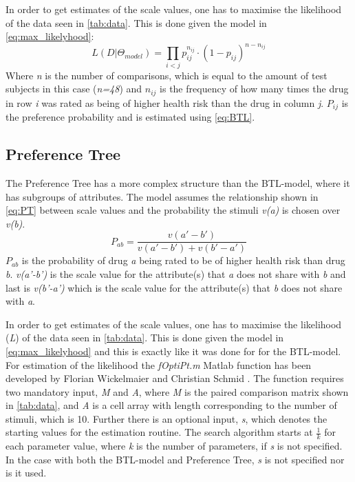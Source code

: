 In order to get estimates of the scale values, one has to maximise the likelihood of the data seen in \autoref{tab:data}. This is done given the model in \autoref{eq:max_likelyhood}: 
%
\begin{equation}
L(D|\Theta_{model}) = \prod_{i<j} p_{ij} ^{n_{ij}}\cdot(1- p_{ij})^{n-n_{ij}}
\label{eq:max_likelyhood}
\end{equation}
\noindent 
%
Where \textit{n} is the number of comparisons, which is equal to the amount of test subjects in this case (\textit{n=48}) and $n_{ij}$ is the frequency of how many times the drug in row \textit{i} was rated as being of higher health risk than the drug in column \textit{j}. $P_{ij}$ is the preference probability and is estimated using \autoref{eq:BTL}. 

\subsection*{Preference Tree}
%
The Preference Tree has a more complex structure than the BTL-model, where it has subgroups of attributes. The model assumes the relationship shown in \autoref{eq:PT} between scale values and the probability the stimuli \textit{v(a)} is chosen over \textit{v(b)}.
%
\begin{equation}
P_{ab} =\frac{v(a'-b')}{v(a'-b')+v(b'-a')} 
\label{eq:PT}
\end{equation}
\noindent
%
$P_{ab}$ is the probability of drug \textit{a} being rated to be of higher health risk than drug \textit{b}. \textit{v(a'-b')} is the scale value for the attribute(s) that \textit{a} does not share with \textit{b} and last is \textit{v(b'-a')} which is the scale value for the attribute(s) that \textit{b} does not share with \textit{a}.

In order to get estimates of the scale values, one has to maximise the likelihood (\textit{L}) of the data seen in \autoref{tab:data}. This is done given the model in \autoref{eq:max_likelyhood} and this is exactly like it was done for for the BTL-model. \blankline
%
For estimation of the likelihood the \textit{fOptiPt.m} Matlab function has been developed by Florian Wickelmaier and Christian Schmid \parencite{Wickelmaier2004}. The function requires two mandatory input, \textit{M} and \textit{A}, where \textit{M} is the paired comparison matrix shown in \autoref{tab:data}, and \textit{A} is a cell array with length corresponding to the number of stimuli, which is 10. Further there is an optional input, \textit{s}, which denotes the starting values for the estimation routine. The search algorithm starts at $\frac{1}{k}$ for each parameter value, where \textit{k} is the number of parameters, if \textit{s} is not specified. In the case with both the BTL-model and Preference Tree, \textit{s} is not specified nor is it used.